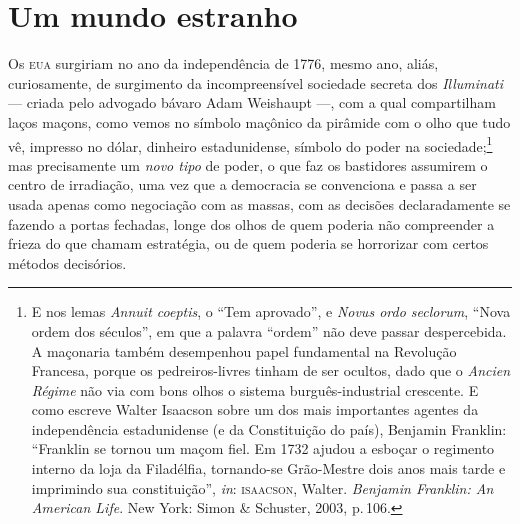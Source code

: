 \section{Um mundo estranho}

Os \textsc{eua} surgiriam no ano da independência de 1776, mesmo ano, aliás,
curiosamente, de surgimento da incompreensível sociedade secreta dos
\emph{Illuminati} --- criada pelo advogado bávaro Adam Weishaupt ---, com a qual compartilham laços maçons, como vemos no símbolo maçônico da pirâmide com o olho que tudo vê, impresso no dólar, dinheiro estadunidense, símbolo do poder na
sociedade;\footnote{E nos
  lemas \emph{Annuit coeptis}, o ``Tem aprovado'', e \emph{Novus ordo
  seclorum}, ``Nova ordem dos séculos'', em que a palavra ``ordem'' não
  deve passar despercebida. A maçonaria também desempenhou papel
  fundamental na Revolução Francesa, porque os pedreiros-livres tinham
  de ser ocultos, dado que o \emph{Ancien Régime} não via com bons olhos
  o sistema burguês-industrial crescente. E como escreve Walter Isaacson
  sobre um dos mais importantes agentes da independência estadunidense
  (e da Constituição do país), Benjamin Franklin: ``Franklin se tornou
  um maçom fiel. Em 1732 ajudou a esboçar o regimento interno da loja da
  Filadélfia, tornando-se Grão-Mestre dois anos mais tarde e imprimindo
  sua constituição'', \emph{in}: \textsc{isaacson}, Walter. \emph{Benjamin
  Franklin: An American Life}. New York: Simon \& Schuster, 2003, p.\,106.}
 mas precisamente um \emph{novo tipo} de poder, o que faz os
bastidores assumirem o centro de irradiação, uma vez que a democracia se
convenciona e passa a ser usada apenas como negociação com as massas,
com as decisões declaradamente se fazendo a portas fechadas, longe dos
olhos de quem poderia não compreender a frieza do que chamam estratégia,
ou de quem poderia se horrorizar com certos métodos decisórios.

